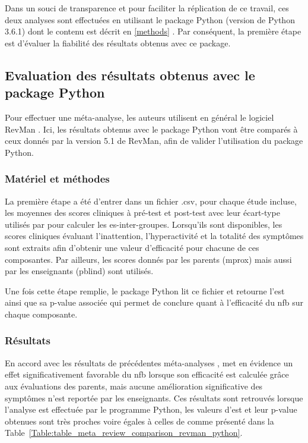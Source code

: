 Dans un souci de transparence et pour faciliter la réplication de ce travail, ces deux analyses sont effectuées en utilisant le package Python 
(version de Python 3.6.1) dont le contenu est décrit en \ref{methods} \citep{Bussalb2019c}. Par conséquent, la première étape est d'évaluer la
fiabilité des résultats obtenus avec ce package.

\subsection{Evaluation des résultats obtenus avec le package Python} 

Pour effectuer une méta-analyse, les auteurs utilisent en général le logiciel RevMan \citep{Revman, Cortese2016, Micoulaud2014}. Ici, les résultats 
obtenus avec le package Python vont être comparés à ceux donnés par la version 5.1 de RevMan, afin de valider l'utilisation du package Python.

\subsubsection{Matériel et méthodes}
La première étape a été d'entrer dans un fichier .csv, pour chaque étude incluse, les moyennes des scores cliniques à pré-test et post-test avec leur écart-type 
utilisés par \citet{Cortese2016} pour calculer les \gls{es}-inter-groupes. Lorsqu'ils sont disponibles, les scores cliniques évaluant l'inattention, l'hyperactivité 
et la totalité des symptômes sont extraits afin d'obtenir une valeur d'efficacité pour chacune de ces composantes. Par ailleurs, les scores donnés par les
parents (\gls{mprox}) mais aussi par les enseignants (\gls{pblind}) sont utilisés.

Une fois cette étape remplie, le package Python lit ce fichier et retourne l'\gls{est} ainsi que sa p-value associée qui permet de conclure quant à l'efficacité
du \gls{nfb} sur chaque composante.

\subsubsection{Résultats}
En accord avec les résultats de précédentes méta-analyses \citep{Sonuga-Barke2013, Micoulaud2014}, \citet{Cortese2016}
met en évidence un effet significativement favorable du \gls{nfb} lorsque son efficacité est calculée grâce aux évaluations des parents, mais aucune amélioration 
significative des symptômes n'est reportée par les enseignants. Ces résultats sont retrouvés lorsque l'analyse est effectuée par le programme Python, les valeurs
d'\gls{est} et leur p-value obtenues sont très proches voire égales à celles de \citet{Cortese2016} comme présenté dans la 
Table~\ref{Table:table_meta_review_comparison_revman_python}. 

